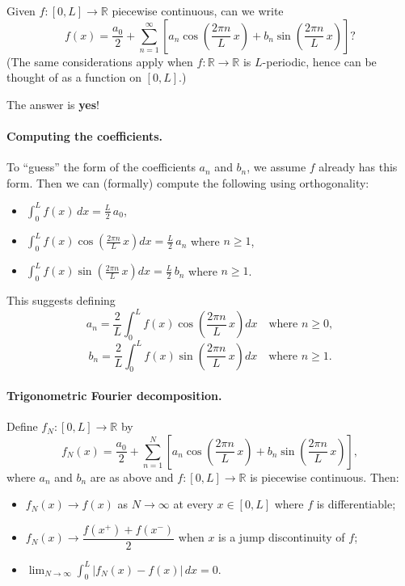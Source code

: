 Given $f : [0, L] \to \mathbb{R}$ piecewise continuous, can we write
\[
f(x) = \frac{a_0}{2} + \sum_{n=1}^{\infty}\left[a_n \cos\!\left(\frac{2\pi n}{L}\,x\right) + b_n \sin\!\left(\frac{2\pi n}{L}\,x\right)\right]?
\]
(The same considerations apply when $f : \mathbb{R} \to \mathbb{R}$ is $L$-periodic, hence can be thought of as a function on $[0, L]$.)

The answer is \textbf{yes}!

\paragraph{Computing the coefficients.}
To ``guess'' the form of the coefficients $a_n$ and $b_n$, we assume $f$ already has this form. Then we can (formally) compute the following using orthogonality:
\begin{itemize}
\item $\displaystyle\int_0^L f(x)\,dx = \frac{L}{2}\,a_0$,
\item $\displaystyle\int_0^L f(x)\cos\!\left(\frac{2\pi n}{L}\,x\right)dx = \frac{L}{2}\,a_n$ where $n \geq 1$,
\item $\displaystyle\int_0^L f(x)\sin\!\left(\frac{2\pi n}{L}\,x\right)dx = \frac{L}{2}\,b_n$ where $n \geq 1$.
\end{itemize}
This suggests defining
\[
\boxed{
a_n = \frac{2}{L}\int_0^L f(x)\cos\!\left(\frac{2\pi n}{L}\,x\right)dx \quad \text{where } n \geq 0,}
\]
\[
\boxed{
b_n = \frac{2}{L}\int_0^L f(x)\sin\!\left(\frac{2\pi n}{L}\,x\right)dx \quad \text{where } n \geq 1.}
\]

\paragraph{Trigonometric Fourier decomposition.}
Define $f_N : [0, L] \to \mathbb{R}$ by
\[
f_N(x) = \frac{a_0}{2} + \sum_{n=1}^{N}\left[a_n \cos\!\left(\frac{2\pi n}{L}\,x\right) + b_n \sin\!\left(\frac{2\pi n}{L}\,x\right)\right],
\]
where $a_n$ and $b_n$ are as above and $f : [0, L] \to \mathbb{R}$ is piecewise continuous. Then:
\begin{itemize}
\item $f_N(x) \to f(x)$ as $N \to \infty$ at every $x \in [0, L]$ where $f$ is differentiable;
\item $f_N(x) \to \dfrac{f(x^+) + f(x^-)}{2}$ when $x$ is a jump discontinuity of $f$;
\item $\displaystyle\lim_{N \to \infty}\int_0^L |f_N(x) - f(x)|\,dx = 0$.
\end{itemize}


